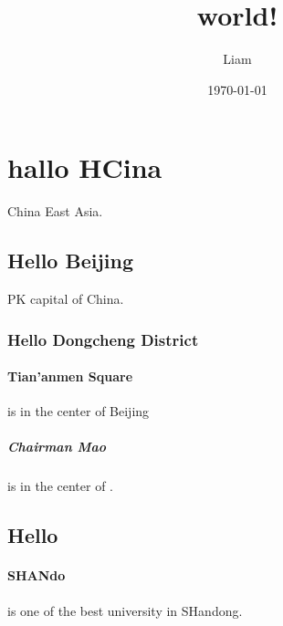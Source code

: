 \documentclass{article}
\title{world!}
\author{Liam}
\date{\today}
\begin{document}
\maketitle
\tableofcontents
\newpage
\section{hallo HCina}
China East Asia.
\subsection{Hello Beijing}
PK capital of China.
\subsubsection{Hello Dongcheng District}
\paragraph{Tian'anmen Square}
is in the center of Beijing
\subparagraph{Chairman Mao}
is in the center of .
\subsection{Hello }
\paragraph{SHANdo} is one of the best university in SHandong.
\end{document}
